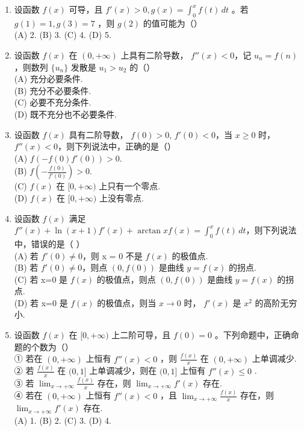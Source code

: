 \documentclass[12pt, a4paper]{ctexart}
\begin{document}
\begin{enumerate}
    \item 设函数 $ f(x) $ 可导，且 $ f'(x) > 0, g(x) = \int_{0}^{x} f(t) \, dt $ 。若 $ g(1) = 1, g(3) = 7 $ ，则 $ g(2) $ 的值可能为（）\\
    (A) 2. \quad (B) 3. \quad (C) 4. \quad (D) 5.

    \item 设函数 $ f(x) $ 在 $ (0, +\infty) $ 上具有二阶导数， $ f''(x) < 0 $，记 $ u_n = f(n) $，则数列 $ \{u_n\} $ 发散是 $ u_1 > u_2 $ 的（）\\
    (A) 充分必要条件.\\
    (B) 充分不必要条件.\\
    (C) 必要不充分条件.\\
    (D) 既不充分也不必要条件.

    \item 设函数 $ f(x) $ 具有二阶导数， $ f(0) > 0 $, $ f'(0) < 0 $，当 $ x \geq 0 $ 时， $ f''(x) < 0 $，则下列说法中，正确的是（）\\
    (A) $ f(-f(0)f'(0)) > 0 $.\\
    (B) $ f\left(-\frac{f(0)}{f'(0)}\right) > 0 $.\\
    (C) $ f(x) $ 在 $ [0, +\infty) $ 上只有一个零点.\\
    (D) $ f(x) $ 在 $ [0, +\infty) $ 上没有零点.

    \item 设函数 $ f(x) $ 满足 $ f''(x) + \ln(x+1)f'(x) + \arctan x f(x) = \int_0^x f(t) \, dt $，则下列说法中，错误的是（ ）\\
    (A) 若 $ f'(0) \neq 0 $，则 x = 0 不是 $ f(x) $ 的极值点.\\
    (B) 若 $ f'(0) \neq 0 $，则点 $ (0, f(0)) $ 是曲线 $ y = f(x) $ 的拐点.\\
    (C) 若 x=0 是 $ f(x) $ 的极值点，则点 $ \left(0,f(0)\right) $ 是曲线 $ y=f(x) $ 的拐点.\\
    (D) 若 x=0 是 $ f(x) $ 的极值点，则当 $ x \to 0 $ 时， $ f'(x) $ 是 $ x^{2} $ 的高阶无穷小.

    \item 设函数 $ f(x) $ 在 $ [0, +\infty) $ 上二阶可导，且 $ f(0) = 0 $ 。下列命题中，正确命题的个数为（）\\
    ① 若在 $ (0,+\infty) $ 上恒有 $ f''(x)<0 $ ，则 $ \frac{f(x)}{x} $ 在 $ (0,+\infty) $ 上单调减少.\\
    ② 若 $ \frac{f(x)}{x} $ 在 $ (0,1] $ 上单调减少，则在 $ (0,1] $ 上恒有 $ f''(x) \leq 0 $ .\\
    ③ 若 $ \lim_{x\to+\infty}\frac{f(x)}{x} $ 存在，则 $ \lim_{x\to+\infty}f'(x) $ 存在.\\
    ④ 若在 $ (0,+\infty) $ 上恒有 $ f''(x)<0 $ ，且 $ \lim_{x\to+\infty}\frac{f(x)}{x} $ 存在，则 $ \lim_{x\to+\infty}f'(x) $ 存在.\\
    (A) 1. \quad (B) 2. \quad (C) 3. \quad (D) 4.


\end{enumerate}
\end{document}
